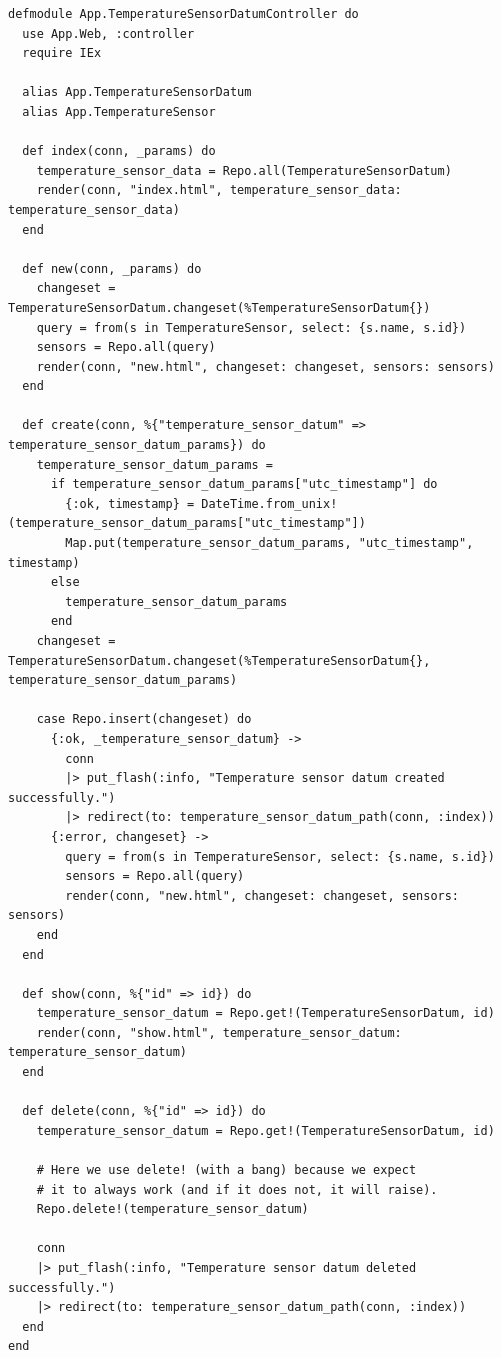 \begin{lstlisting}[caption={Kontroler danych z sensorów temperatur we frameworku Phoenix},label={lst:phoenix_controller}]
defmodule App.TemperatureSensorDatumController do
  use App.Web, :controller
  require IEx

  alias App.TemperatureSensorDatum
  alias App.TemperatureSensor

  def index(conn, _params) do
    temperature_sensor_data = Repo.all(TemperatureSensorDatum)
    render(conn, "index.html", temperature_sensor_data: temperature_sensor_data)
  end

  def new(conn, _params) do
    changeset = TemperatureSensorDatum.changeset(%TemperatureSensorDatum{})
    query = from(s in TemperatureSensor, select: {s.name, s.id})
    sensors = Repo.all(query)
    render(conn, "new.html", changeset: changeset, sensors: sensors)
  end

  def create(conn, %{"temperature_sensor_datum" => temperature_sensor_datum_params}) do
    temperature_sensor_datum_params =
      if temperature_sensor_datum_params["utc_timestamp"] do
        {:ok, timestamp} = DateTime.from_unix!(temperature_sensor_datum_params["utc_timestamp"])
        Map.put(temperature_sensor_datum_params, "utc_timestamp", timestamp)
      else
        temperature_sensor_datum_params
      end
    changeset = TemperatureSensorDatum.changeset(%TemperatureSensorDatum{}, temperature_sensor_datum_params)

    case Repo.insert(changeset) do
      {:ok, _temperature_sensor_datum} ->
        conn
        |> put_flash(:info, "Temperature sensor datum created successfully.")
        |> redirect(to: temperature_sensor_datum_path(conn, :index))
      {:error, changeset} ->
        query = from(s in TemperatureSensor, select: {s.name, s.id})
        sensors = Repo.all(query)
        render(conn, "new.html", changeset: changeset, sensors: sensors)
    end
  end

  def show(conn, %{"id" => id}) do
    temperature_sensor_datum = Repo.get!(TemperatureSensorDatum, id)
    render(conn, "show.html", temperature_sensor_datum: temperature_sensor_datum)
  end

  def delete(conn, %{"id" => id}) do
    temperature_sensor_datum = Repo.get!(TemperatureSensorDatum, id)

    # Here we use delete! (with a bang) because we expect
    # it to always work (and if it does not, it will raise).
    Repo.delete!(temperature_sensor_datum)

    conn
    |> put_flash(:info, "Temperature sensor datum deleted successfully.")
    |> redirect(to: temperature_sensor_datum_path(conn, :index))
  end
end
\end{lstlisting}

